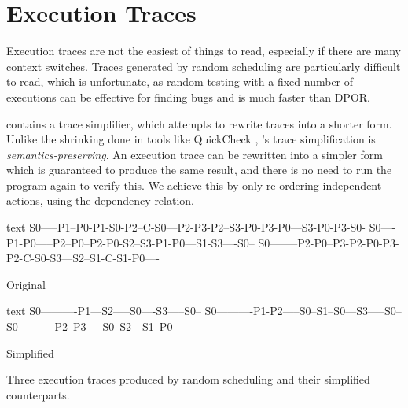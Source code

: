 \section{Execution Traces}
\label{sec:dejafu-traces}

Execution traces are not the easiest of things to read, especially if
there are many context switches.  Traces generated by random
scheduling are particularly difficult to read, which is unfortunate,
as random testing with a fixed number of executions can be effective
for finding bugs and is much faster than DPOR.

\dejafu{} contains a trace simplifier, which attempts to rewrite
traces into a shorter form.  Unlike the shrinking done in tools like
QuickCheck \parencite{claessen2000}, \dejafu{}'s trace simplification is
\emph{semantics-preserving}.  An execution trace can be rewritten into
a simpler form which is guaranteed to produce the same result, and
there is no need to run the program again to verify this.  We achieve
this by only re-ordering independent actions, using the dependency
relation.

\begin{listing}
\begin{sublisting}{\textwidth}
\centering
\begin{cminted}{text}
S0-----P1--P0-P1-S0-P2--C-S0---P2-P3-P2--S3-P0-P3-P0---S3-P0-P3-S0-
S0----P1-P0-----P2--P0--P2-P0-S2--S3-P1-P0---S1-S3----S0--
S0--------P2-P0--P3-P2-P0-P3-P2-C-S0-S3---S2--S1-C-S1-P0----
\end{cminted}
\caption{Original}\label{lst:trace_simplification_orig}
\end{sublisting}

\vspace{1.5em}

\begin{sublisting}{\textwidth}
\centering
\begin{cminted}{text}
S0----------P1---S2-----S0----S3-----S0--
S0----------P1-P2-----S0--S1--S0---S3-----S0--
S0----------P2--P3-----S0--S2---S1--P0----
\end{cminted}
\caption{Simplified}\label{lst:trace_simplification_simplified}
\end{sublisting}
\caption[The effect of trace simplification.]{Three execution traces produced by random scheduling and their simplified counterparts.}\label{lst:trace_simplification}
\end{listing}

